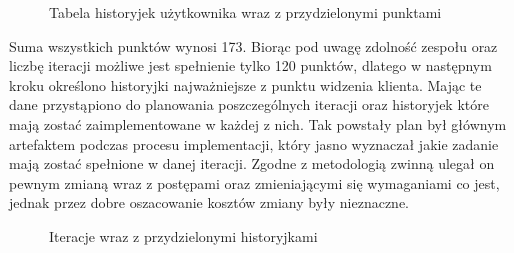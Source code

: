 \begin{figure}[h!]
	\caption{Tabela historyjek użytkownika wraz z przydzielonymi punktami}
	\centering
\end{figure}

Suma wszystkich punktów wynosi 173. Biorąc pod uwagę zdolność zespołu oraz liczbę iteracji możliwe jest spełnienie tylko 120 punktów, dlatego w następnym kroku określono historyjki najważniejsze z punktu widzenia klienta. Mając te dane przystąpiono do planowania poszczególnych iteracji oraz historyjek które mają zostać zaimplementowane w każdej z nich. Tak powstały plan był głównym artefaktem podczas procesu implementacji, który jasno wyznaczał jakie zadanie mają zostać spełnione w danej iteracji. Zgodne z metodologią zwinną ulegał on pewnym zmianą wraz z postępami oraz zmieniającymi się wymaganiami co jest, jednak przez dobre oszacowanie kosztów zmiany były nieznaczne. 
\bigskip

\begin{figure}[h!]
	\caption{Iteracje wraz z przydzielonymi historyjkami}
	\centering
\end{figure}

